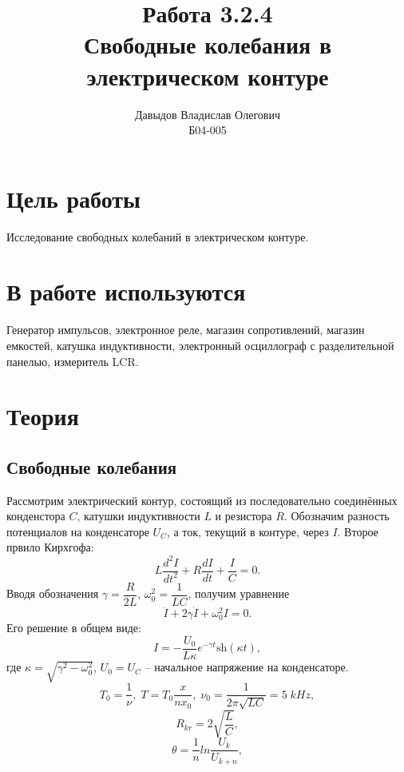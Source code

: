 \documentclass[a4paper, 12pt]{article}%
\author{Давыдов Владислав Олегович \\
Б04-005}
\title{\textbf{Работа 3.2.4\\Свободные колебания в электрическом контуре}}
\date{}
\begin{document}
\maketitle
\newpage
\section*{Цель работы}
Исследование свободных колебаний в электрическом контуре.
\section*{В работе используются}
Генератор импульсов, электронное реле, магазин сопротивлений, магазин емкостей, катушка индуктивности, электронный осциллограф с разделительной панелью, измеритель LCR.
\section*{Теория}
\subsection*{Свободные колебания}
Рассмотрим электрический контур, состоящий из последовательно соединённых конденстора $C$, катушки индуктивности $L$ и резистора $R$. Обозначим разность потенциалов на конденсаторе $U_C$, а ток, текущий в контуре, через $I$. Второе првило Кирхгофа:
\begin{equation}
L \dfrac{d^2I}{dt^2}+R\dfrac{dI}{dt}+\dfrac{I}{C}=0.
\end{equation}
Вводя обозначения $\gamma = \dfrac{R}{2L}$, $\omega_0^2=\dfrac{1}{LC}$, получим уравнение
\begin{equation}
\ddot{I}+2\gamma\dot{I}+\omega_0^2I=0.
\end{equation}
Его решение в общем виде:
\begin{equation}
I = -\dfrac{U_0}{L\kappa}e^{-\gamma t}\text{sh}(\kappa t), 
\end{equation}
где $\kappa = \sqrt{\gamma^2 - \omega_0^2}$, $U_0 = U_C$ -- начальное напряжение на конденсаторе.
\begin{equation}
T_{0} = \dfrac{1}{\nu}, \; T = T_{0} \dfrac{x}{n x_{0}} , \; \nu_{0} = \dfrac{1}{2 \pi \sqrt{L C}} = 5 \; kHz ,
\end{equation}
\begin{equation}
R_{kr} = 2 \sqrt{\dfrac{L}{C}} ,
\end{equation}
\begin{equation}
\theta = \dfrac{1}{n} ln \dfrac{U_{k}}{U_{k+n}} ,
\end{equation}
\newpage
\end{document}
